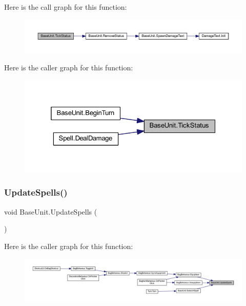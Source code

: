 Here is the call graph for this function\+:
\nopagebreak
\begin{figure}[H]
\begin{center}
\leavevmode
\includegraphics[width=350pt]{class_base_unit_af140c1094709a0a90f84d52a4ee80d90_cgraph}
\end{center}
\end{figure}
Here is the caller graph for this function\+:
\nopagebreak
\begin{figure}[H]
\begin{center}
\leavevmode
\includegraphics[width=325pt]{class_base_unit_af140c1094709a0a90f84d52a4ee80d90_icgraph}
\end{center}
\end{figure}
\mbox{\label{class_base_unit_a8b9c4263f81ef40c1841d26ee0573bce}} 
\subsubsection{\texorpdfstring{UpdateSpells()}{UpdateSpells()}}
{\footnotesize\ttfamily void Base\+Unit.\+Update\+Spells (\begin{DoxyParamCaption}{ }\end{DoxyParamCaption})}

Here is the caller graph for this function\+:
\nopagebreak
\begin{figure}[H]
\begin{center}
\leavevmode
\includegraphics[width=350pt]{class_base_unit_a8b9c4263f81ef40c1841d26ee0573bce_icgraph}
\end{center}
\end{figure}


